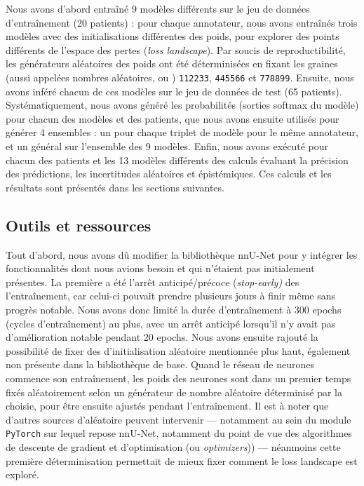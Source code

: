 \documentclass[a4paper,french,bookmarks,12pt]{article}
\begin{document}
    Nous avons d'abord entraîné 9 modèles différents sur le jeu de données d’entraînement (20 patients) : pour chaque annotateur, nous avons entraînés trois modèles avec des initialisations différentes des poids, pour explorer des points différents de l'espace des pertes (\emph{loss landscape}). Par soucis de reproductibilité, les générateurs aléatoires des poids ont été déterminisées en fixant les graines (aussi appelées nombres aléatoires, ou ) \texttt{112233}, \texttt{445566} et \texttt{778899}. Ensuite, nous avons inféré chacun de ces modèles sur le jeu de données de test (65 patients). Systématiquement, nous avons généré les probabilités (sorties softmax du modèle) pour chacun des modèles et des patients, que nous avons ensuite utilisés pour générer 4 ensembles : un pour chaque triplet de modèle pour le même annotateur, et un général sur l'ensemble des 9 modèles. Enfin, nous avons exécuté pour chacun des patients et les 13 modèles différents des calculs évaluant la précision des prédictions, les incertitudes aléatoires et épistémiques. Ces calculs et les résultats sont présentés dans les sections suivantes.

    \subsection{Outils et ressources}

    Tout d'abord, nous avons dû modifier la bibliothèque nnU-Net pour y intégrer les fonctionnalités dont nous avions besoin et qui n'étaient pas initialement présentes. La première a été l'arrêt anticipé/précoce (\emph{stop-early)} des l'entraînement, car celui-ci pouvait prendre plusieurs jours à finir même sans progrès notable. Nous avons donc limité la durée d'entraînement à 300 epochs (cycles d'entraînement) au plus, avec un arrêt anticipé lorsqu'il n'y avait pas d'amélioration notable pendant 20 epochs. Nous avons ensuite rajouté la possibilité de fixer des  d'initialisation aléatoire mentionnée plus haut, également non présente dans la bibliothèque de base. Quand le réseau de neurones commence son entraînement, les poids des neurones sont dans un premier temps fixés aléatoirement selon un générateur de nombre aléatoire déterminisé par la  choisie, pour être ensuite ajustés pendant l'entraînement. Il est à noter que d'autres sources d'aléatoire peuvent intervenir --- notamment au sein du module \texttt{PyTorch} sur lequel repose nnU-Net, notamment du point de vue des algorithmes de descente de gradient et d'optimisation (ou \emph{optimizers})) --- néanmoins cette première déterminisation permettait de mieux fixer comment le loss landscape est exploré. 
\end{document}
